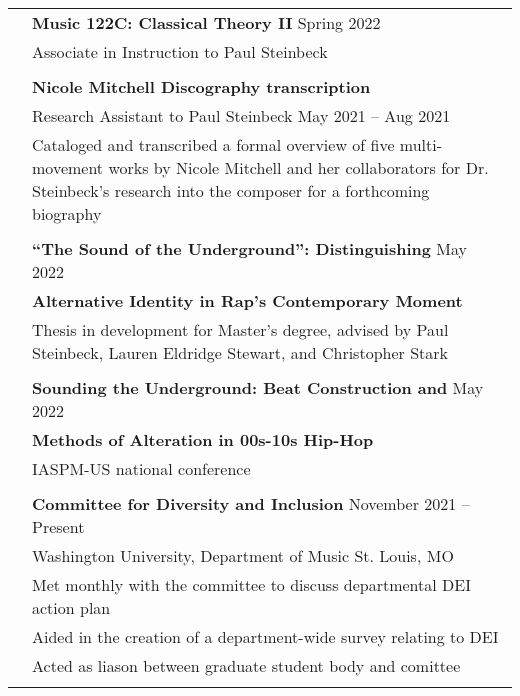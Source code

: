 \documentclass[letterpaper, 11pt]{article}
\begin{document}
\begin{longtable}{p{1.3in}p{4.8in}}
& \textbf{Music 122C: Classical Theory II} \hfill Spring 2022 \\
& Associate in Instruction to Paul Steinbeck \\
& \\

\nohyphens{\color{OliveGreen}{Research Projects}} 
& \textbf{Nicole Mitchell Discography transcription} \\
& Research Assistant to Paul Steinbeck \hfill May 2021 -- Aug 2021 \\
& Cataloged and transcribed a formal overview of five multi-movement works by Nicole Mitchell and her collaborators for Dr. Steinbeck's research into the composer for a forthcoming biography \\
& \\

\nohyphens{\color{OliveGreen}{Writing Projects}} 
& \textbf{``The Sound of the Underground'': Distinguishing} \hfill{May 2022} \\
& \textbf{Alternative Identity in Rap's Contemporary Moment} \\
& Thesis in development for Master's degree, advised by Paul Steinbeck, Lauren Eldridge Stewart, and Christopher Stark \\
& \\

\newpage
{\color{OliveGreen}{Presentations}} 
& \textbf{Sounding the Underground: Beat Construction and} \hfill May 2022 \\
{\color{OliveGreen}{\& Lectures}} 
& \textbf{Methods of Alteration in 00s-10s Hip-Hop} \\
& IASPM-US national conference \\
& \\

\color{OliveGreen}{University Service}
& \textbf{Committee for Diversity and Inclusion} \hfill November 2021 -- Present \\
& Washington University, Department of Music \hfill St. Louis, MO\\
& Met monthly with the committee to discuss departmental DEI action plan\\
& Aided in the creation of a department-wide survey relating to DEI \\
& Acted as liason between graduate student body and comittee \\
& \\


\end{longtable}
\end{document}
